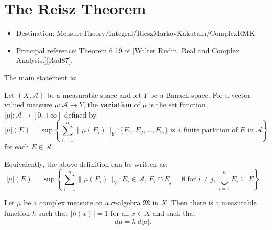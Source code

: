 \chapter{The Reisz Theorem}

\begin{itemize}
  \item Destination: MeasureTheory/Integral/RieszMarkovKakutam/ComplexRMK
  \item Principal reference: Theorem 6.19 of [Walter Rudin, Real and Complex Analysis.][Rud87].
\end{itemize}

The main statement is:

\noindent
{}

\begin{definition}
  \label{def:variation}
  \leanok
  Let $(X, \mathcal{A})$ be a measurable space and let $Y$ be a Banach space. For a vector-valued measure $\mu: \mathcal{A} \to Y$, the \textbf{variation} of $\mu$ is the set function $|\mu|: \mathcal{A} \to [0, +\infty]$ defined by
  \begin{equation*}
    |\mu|(E) = \sup \left\{ \sum_{i=1}^n \|\mu(E_i)\|_Y : \{E_1, E_2, \ldots, E_n\} \text{ is a finite partition of } E \text{ in } \mathcal{A} \right\}
  \end{equation*}
  for each $E \in \mathcal{A}$.
\end{definition}

Equivalently, the above definition can be written as:
\begin{equation*}
  |\mu|(E) = \sup \left\{ \sum_{i=1}^n \|\mu(E_i)\|_Y : E_i \in \mathcal{A}, \, E_i \cap E_j = \emptyset \text{ for } i \neq j, \, \bigcup_{i=1}^n E_i \subseteq E \right\}
\end{equation*}

\begin{theorem}
  \label{thm:polar_rep}
  Let $\mu$ be a complex measure on a $\sigma$-algebra $\mathfrak{M}$ in $X$. Then there is a measurable function $h$ such that $|h(x)| = 1$ for all $x \in X$ and such that
  \begin{equation}
    d\mu = h \, d|\mu|.
  \end{equation}
\end{theorem}

